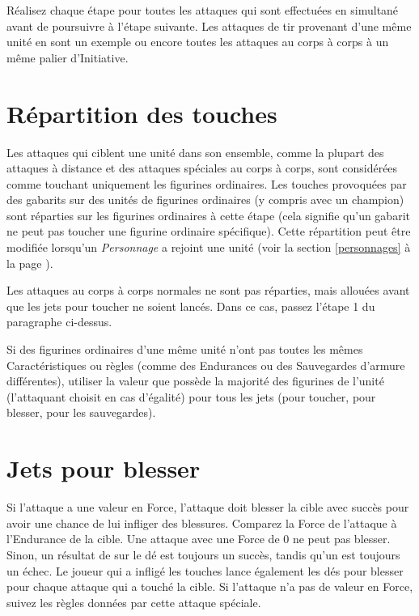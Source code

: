 Réalisez chaque étape pour toutes les attaques qui sont effectuées en simultané avant de poursuivre à l'étape suivante. Les attaques de tir provenant d'une même unité en sont un exemple ou encore toutes les attaques au corps à corps à un même palier d'Initiative.

\section{Répartition des touches}

Les attaques qui ciblent une unité dans son ensemble, comme la plupart des attaques à distance et des attaques spéciales au corps à corps, sont considérées comme touchant uniquement les figurines ordinaires. Les touches provoquées par des gabarits sur des unités de figurines ordinaires (y compris avec un champion) sont réparties sur les figurines ordinaires à cette étape (cela signifie qu'un gabarit ne peut pas toucher une figurine ordinaire spécifique). Cette répartition peut être modifiée lorsqu'un \emph{Personnage} a rejoint une unité (voir la section \ref{personnages} à la page \pageref{personnages}).  

Les attaques au corps à corps normales ne sont pas réparties, mais allouées avant que les jets pour toucher ne soient lancés. Dans ce cas, passez l'étape 1 du paragraphe ci-dessus. 

Si des figurines ordinaires d'une même unité n'ont pas toutes les mêmes Caractéristiques ou règles (comme des Endurances ou des Sauvegardes d'armure différentes), utiliser la valeur que possède la majorité des figurines de l’unité (l'attaquant choisit en cas d'égalité) pour tous les jets (pour toucher, pour blesser, pour les sauvegardes).

\section{Jets pour blesser}

Si l'attaque a une valeur en Force, l'attaque doit blesser la cible avec succès pour avoir une chance de lui infliger des blessures. Comparez la Force de l'attaque à l'Endurance de la cible. Une attaque avec une Force de 0 ne peut pas blesser. Sinon, un résultat de  sur le dé est toujours un succès, tandis qu'un  est toujours un échec. Le joueur qui a infligé les touches lance également les dés pour blesser pour chaque attaque qui a touché la cible. Si l'attaque n'a pas de valeur en Force, suivez les règles données par cette attaque spéciale. 

